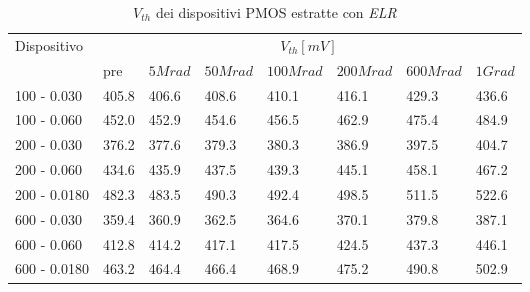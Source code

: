 \documentclass[
	a4paper,
	cleardoublepage=empty,
	headings=twolinechapter,
	numbers=autoenddot,
]{scrbook}
\begin{document}
\begin{table}[H]
  \renewcommand{\arraystretch}{1.3}
  \begin{tabular}{m{2.1cm} m{0.8cm} m{1.1cm} m{1.3cm} m{1.5cm} m{1.5cm} m{1.5cm} m{1cm}}
    \toprule
    \multirow{2}{*}{Dispositivo} & \multicolumn{7}{c}{$V_{th} [mV] $}                                                                    \\
    \cmidrule{2-8}
                                 & pre                                & $5Mrad$ & $50Mrad$ & $100Mrad$ & $200Mrad$ & $600Mrad$ & $1Grad$ \\
    \midrule
    100 - 0.030                     & 405.8                              & 406.6   & 408.6    & 410.1     & 416.1     & 429.3     & 436.6   \\
    \hline
    100 - 0.060                     & 452.0                              & 452.9   & 454.6    & 456.5     & 462.9     & 475.4     & 484.9   \\
    \hline
    200 - 0.030                     & 376.2                              & 377.6   & 379.3    & 380.3     & 386.9     & 397.5     & 404.7   \\
    \hline
    200 - 0.060                     & 434.6                              & 435.9   & 437.5    & 439.3     & 445.1     & 458.1     & 467.2   \\
    \hline
    200 - 0.0180                    & 482.3                              & 483.5   & 490.3    & 492.4     & 498.5     & 511.5     & 522.6   \\
    \hline
    600 - 0.030                     & 359.4                              & 360.9   & 362.5    & 364.6     & 370.1     & 379.8     & 387.1   \\
    \hline
    600 - 0.060                     & 412.8                              & 414.2   & 417.1    & 417.5     & 424.5     & 437.3     & 446.1   \\
    \hline
    600 - 0.0180                    & 463.2                              & 464.4   & 466.4    & 468.9     & 475.2     & 490.8     & 502.9   \\
    \bottomrule
  \end{tabular}

  \caption{$V_{th}$ dei dispositivi PMOS estratte con \emph{ELR}}
  \label{tab:VthELRP}
\end{table}
\end{document}
